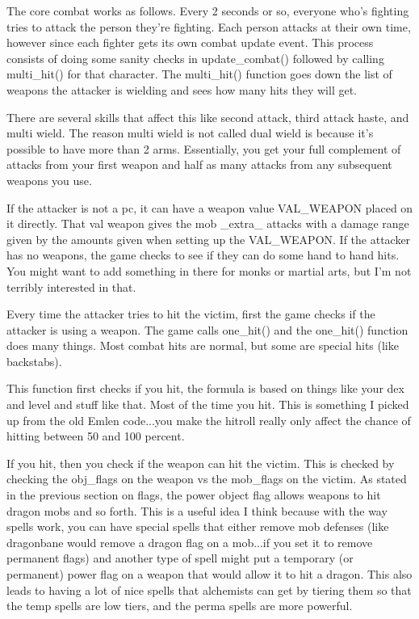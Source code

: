 The core combat works as follows. Every 2 seconds or so, everyone
who's fighting tries to attack the person they're fighting. Each
person attacks at their own time, however since each fighter gets its
own combat update event. This process consists of doing some sanity
checks in update\_combat() followed by calling multi\_hit() for that
character. The multi\_hit() function goes down the list of weapons the
attacker is wielding and sees how many hits they will get.

There are several skills that affect
this like second attack, third attack haste, and multi wield. The
reason multi wield is not called dual wield is because it's possible
to have more than 2 arms. Essentially, you get your full complement of
attacks from your first weapon and half as many attacks from any
subsequent weapons you use.

 If the attacker is not a pc, it can have a
weapon value VAL\_WEAPON placed on it directly. That val weapon gives
the mob \_extra\_ attacks with a damage range given by the amounts
given when setting up the VAL\_WEAPON. If the attacker has no weapons,
the game checks to see if they can do some hand to hand hits. You
might want to add something in there for monks or martial arts, but
I'm not terribly interested in that.



Every time the attacker tries to hit the victim, first the game
checks if the attacker is using a weapon. The game calls one\_hit()
and the one\_hit() function does many things. Most combat hits are
normal, but some are special hits (like backstabs).

This function first checks if you hit, the formula is based on things
like your dex and level and stuff like that. Most of the time you hit.
This is something I picked up from the old Emlen code...you make the
hitroll really only affect the chance of hitting between 50 and 100
percent. 

If you hit, then you check if the weapon can hit the victim. This is
checked by checking the obj\_flags on the weapon vs the mob\_flags on
the victim. As stated in the previous section on flags, the 
power object flag allows weapons to hit dragon mobs and so forth.
This is a useful idea I think because with the way spells work,
you can have special spells that either remove mob defenses (like
dragonbane would remove a dragon flag on a mob...if you set it to
remove permanent flags) and another type of spell might put a
temporary (or permanent) power flag on a weapon that would allow it
to hit a dragon. This also leads to having a lot of nice spells
that alchemists can get by tiering them so that the temp spells
are low tiers, and the perma spells are more powerful.

